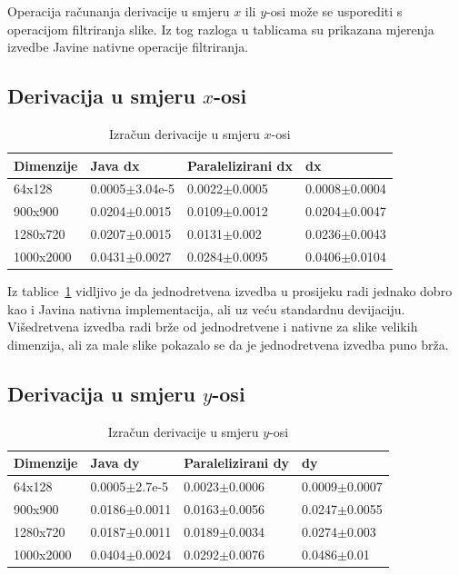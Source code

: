 \documentclass[times, utf8, zavrsni]{fer}
\begin{document}
Operacija računanja derivacije u smjeru \(x\) ili \(y\)-osi može se usporediti s operacijom filtriranja slike. Iz tog razloga u tablicama su prikazana mjerenja izvedbe Javine nativne operacije filtriranja.

\subsection{Derivacija u smjeru \(x\)-osi}

\begin{table}[htb]
	\centering
	\caption{Izračun derivacije u smjeru \(x\)-osi}
	\label{tbl:dx}
	\begin{tabular}{llll} \hline
		Dimenzije & Java dx & Paralelizirani dx & dx\\ \hline
		64x128 & 0.0005$\pm$3.04e-5 & 0.0022$\pm$0.0005 & 0.0008$\pm$0.0004\\
		900x900 & 0.0204$\pm$0.0015 & 0.0109$\pm$0.0012 & 0.0204$\pm$0.0047\\
		1280x720 & 0.0207$\pm$0.0015 & 0.0131$\pm$0.002 & 0.0236$\pm$0.0043\\
		1000x2000 & 0.0431$\pm$0.0027 & 0.0284$\pm$0.0095 & 0.0406$\pm$0.0104\\ \hline
	\end{tabular}
\end{table}

Iz tablice~\ref{tbl:dx} vidljivo je da jednodretvena izvedba u prosijeku radi jednako dobro kao i Javina nativna implementacija, ali uz veću standardnu devijaciju. Višedretvena izvedba radi brže od jednodretvene i nativne za slike velikih dimenzija, ali za male slike pokazalo se da je jednodretvena izvedba puno brža.

\subsection{Derivacija u smjeru \(y\)-osi}

\begin{table}[htb]
	\centering
	\caption{Izračun derivacije u smjeru \(y\)-osi}
	\label{tbl:dy}
	\begin{tabular}{llll} \hline
		Dimenzije & Java dy & Paralelizirani dy & dy\\ \hline
		64x128 & 0.0005$\pm$2.7e-5 & 0.0023$\pm$0.0006 & 0.0009$\pm$0.0007\\
		900x900 & 0.0186$\pm$0.0011 & 0.0163$\pm$0.0056 & 0.0247$\pm$0.0055\\
		1280x720 & 0.0187$\pm$0.0011 & 0.0189$\pm$0.0034 & 0.0274$\pm$0.003\\
		1000x2000 & 0.0404$\pm$0.0024 & 0.0292$\pm$0.0076 & 0.0486$\pm$0.01\\ \hline
	\end{tabular}
\end{table}
\end{document}
